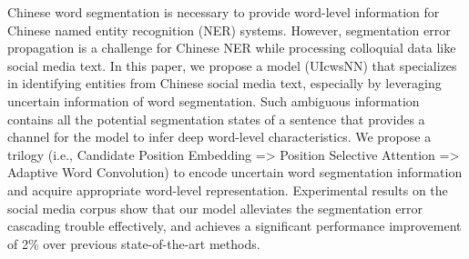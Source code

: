 Chinese word segmentation is necessary to provide word-level information for Chinese named entity recognition (NER) systems. However, segmentation error propagation is a challenge for Chinese NER while processing colloquial data like social media text. In this paper, we propose a model (UIcwsNN) that specializes in identifying entities from Chinese social media text, especially by leveraging uncertain information of word segmentation. Such ambiguous information contains all the potential segmentation states of a sentence that provides a channel for the model to infer deep word-level characteristics. We propose a trilogy (i.e., Candidate Position Embedding => Position Selective Attention => Adaptive Word Convolution) to encode uncertain word segmentation information and acquire appropriate word-level representation. Experimental results on the social media corpus show that our model alleviates the segmentation error cascading trouble effectively, and achieves a significant performance improvement of 2\% over previous state-of-the-art methods.

